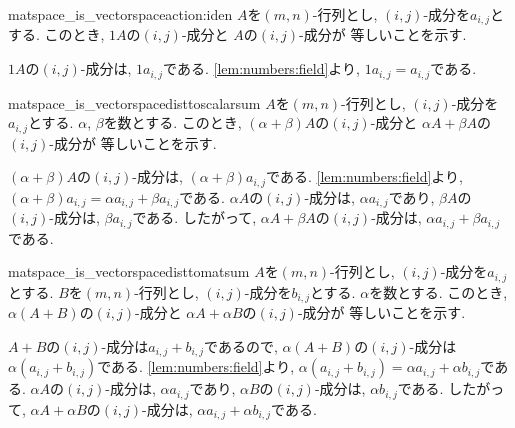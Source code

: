 \begin{proofof*}{matspace_is_vectorspace}{action:iden}
  $A$を$(m,n)$-行列とし, $(i,j)$-成分を$a_{i,j}$とする.
  このとき,
  $1A$の$(i,j)$-成分と
  $A$の$(i,j)$-成分が
  等しいことを示す.

  $1A$の$(i,j)$-成分は, $1a_{i,j}$である.
  \cref{lem:numbers:field}より,
  $1a_{i,j}=a_{i,j}$である.
\end{proofof*}

\begin{proofof*}{matspace_is_vectorspace}{disttoscalarsum}
  $A$を$(m,n)$-行列とし, $(i,j)$-成分を$a_{i,j}$とする.
  $\alpha$, $\beta$を数とする.
  このとき,
  $(\alpha+\beta)A$の$(i,j)$-成分と
  $\alpha A+ \beta A$の$(i,j)$-成分が
  等しいことを示す.
  

  $(\alpha+\beta)A$の$(i,j)$-成分は, $(\alpha+\beta)a_{i,j}$である.
  \cref{lem:numbers:field}より,
  $(\alpha+\beta)a_{i,j}=\alpha a_{i,j}+\beta a_{i,j}$である.
  $\alpha A$の$(i,j)$-成分は, $\alpha a_{i,j}$であり,
  $\beta A$の$(i,j)$-成分は, $\beta a_{i,j}$である.
  したがって,
  $\alpha A+\beta A$の$(i,j)$-成分は, $\alpha a_{i,j}+\beta a_{i,j}$である.
\end{proofof*}

\begin{proofof*}{matspace_is_vectorspace}{disttomatsum}
  $A$を$(m,n)$-行列とし, $(i,j)$-成分を$a_{i,j}$とする.
  $B$を$(m,n)$-行列とし, $(i,j)$-成分を$b_{i,j}$とする.
  $\alpha$を数とする.
  このとき,
  $\alpha(A+B)$の$(i,j)$-成分と
  $\alpha A+ \alpha B$の$(i,j)$-成分が
  等しいことを示す.
  

  $A+B$の$(i,j)$-成分は$a_{i,j}+b_{i,j}$であるので,
  $\alpha(A+B)$の$(i,j)$-成分は$\alpha(a_{i,j}+b_{i,j})$である.
  \cref{lem:numbers:field}より,
  $\alpha(a_{i,j}+b_{i,j})=\alpha a_{i,j}+ \alpha b_{i,j}$である.
  $\alpha A$の$(i,j)$-成分は, $\alpha a_{i,j}$であり,
  $\alpha B$の$(i,j)$-成分は, $\alpha b_{i,j}$である.
  したがって,
  $\alpha A+\alpha B$の$(i,j)$-成分は, $\alpha a_{i,j}+\alpha b_{i,j}$である.
\end{proofof*}

